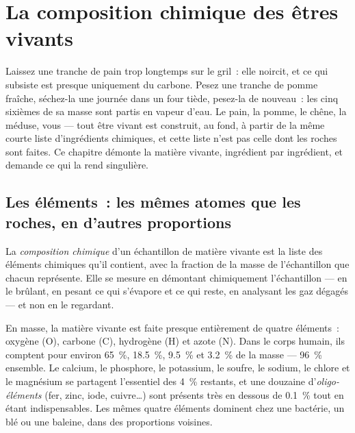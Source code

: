 \chapter{La composition chimique des êtres vivants}\label{ch:g10:chemistry-of-life}

Laissez une tranche de pain trop longtemps sur le gril~: elle noircit, et
ce qui subsiste est presque uniquement du carbone. Pesez une tranche de
pomme fraîche, séchez-la une journée dans un four tiède, pesez-la de
nouveau~: les cinq sixièmes de sa masse sont partis en vapeur d'eau.
Le pain, la pomme, le chêne, la méduse, vous --- tout être vivant est
construit, au fond, à partir de la même courte liste d'ingrédients
chimiques, et cette liste n'est pas celle dont les roches sont faites.
Ce chapitre démonte la matière vivante, ingrédient par ingrédient, et
demande ce qui la rend singulière.

\section{Les éléments~: les mêmes atomes que les roches, en d'autres proportions}

\begin{definition}\label{def:g10:chemistry-of-life:composition}
La \emph{composition chimique} d'un
échantillon de matière vivante est la liste des éléments chimiques
qu'il contient, avec la fraction de la masse de l'échantillon que
chacun représente. Elle se mesure en démontant chimiquement
l'échantillon --- en le brûlant, en pesant ce qui s'évapore et ce qui
reste, en analysant les gaz dégagés --- et non en le regardant.
\end{definition}

\begin{proposition}\label{prop:g10:chemistry-of-life:four}
En masse, la matière vivante est faite presque entièrement de quatre
éléments~: oxygène (O), carbone (C), hydrogène (H) et azote (N). Dans
le corps humain, ils comptent pour environ 65~\%, 18.5~\%, 9.5~\% et
3.2~\% de la masse --- 96~\% ensemble. Le calcium, le phosphore, le
potassium, le soufre, le sodium, le chlore et le magnésium se
partagent l'essentiel des 4~\% restants, et une douzaine
d'\emph{oligo-éléments} (fer, zinc, iode, cuivre\dots) sont présents
très en dessous de 0.1~\% tout en étant indispensables. Les mêmes
quatre éléments dominent chez une bactérie, un blé ou une baleine,
dans des proportions voisines.
\end{proposition}
\admitted

